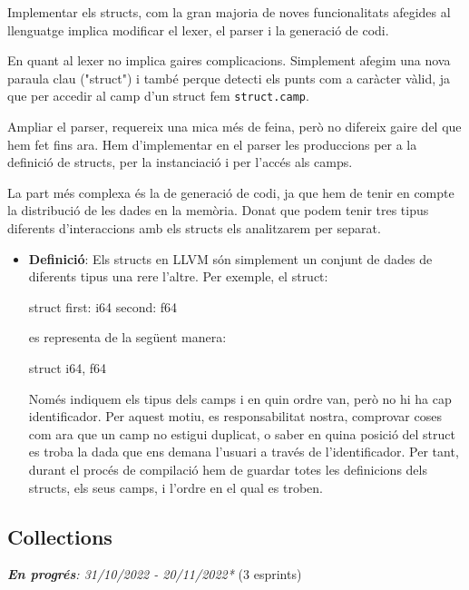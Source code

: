 ﻿\documentclass{article}
\begin{document}
Implementar els structs, com la gran majoria de noves funcionalitats afegides al
llenguatge implica modificar el lexer, el parser i la generació de codi. 

En quant al lexer no implica gaires complicacions. Simplement afegim una nova
paraula clau ("struct") i també perque detecti els punts com a caràcter vàlid,
ja que per accedir al camp d'un struct fem \texttt{struct.camp}.

Ampliar el parser, requereix una mica més de feina, però no difereix gaire del
que hem fet fins ara. Hem d'implementar en el parser les produccions per a la
definició de structs, per la instanciació i per l'accés als camps.

La part més complexa és la de generació de codi, ja que hem de tenir en compte
la distribució de les dades en la memòria. Donat que podem tenir tres tipus
diferents d'interaccions amb els structs els analitzarem per separat.

\begin{itemize}
\item \textbf{Definició}: Els structs en LLVM són simplement un conjunt
    de dades de diferents tipus una rere l'altre. Per exemple, el struct:

    \begin{code}
        struct {
            first: i64
            second: f64
        }
    \end{code}

    es representa de la següent manera:

    \begin{code}
        struct { i64, f64 }
    \end{code}

    Només indiquem els tipus dels camps i en quin ordre van, però no hi ha cap
    identificador. Per aquest motiu, es responsabilitat nostra, comprovar coses
    com ara que un camp no estigui duplicat, o saber en quina posició del struct
    es troba la dada que ens demana l'usuari a través de l'identificador. Per
    tant, durant el procés de compilació hem de guardar totes les definicions
    dels structs, els seus camps, i l'ordre en el qual es troben.
\end{itemize}

\subsection{Collections}
\textit{\textbf{En progrés}: 31/10/2022 - 20/11/2022*} (3 esprints)
\end{document}
